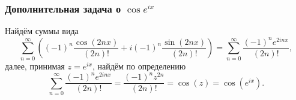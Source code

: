 \subsubsection*{Дополнительная задача о \texorpdfstring{$\cos e^{ix}$}{2}}

Найдём суммы вида
\begin{equation*}
    \sum_{n=0}^{\infty} \left(
        (-1)^n \frac{\cos (2nx)}{(2n)!} + i (-1)^n \frac{\sin(2nx)}{(2n)!}
    \right) = \sum_{n=0}^{\infty} \frac{(-1)^n e^{2inx}}{(2n)!},
\end{equation*}
далее, принимая $z = e^{ix}$, найдём по определению
\begin{equation*}
    \sum_{n=0}^{\infty} \frac{(-1)^n e^{2inx}}{(2n)!} = 
    \frac{(-1)^n z^{2n}}{(2n)!} = \cos \left(
        z
    \right) = \cos \left(e^{ix}\right).
\end{equation*}